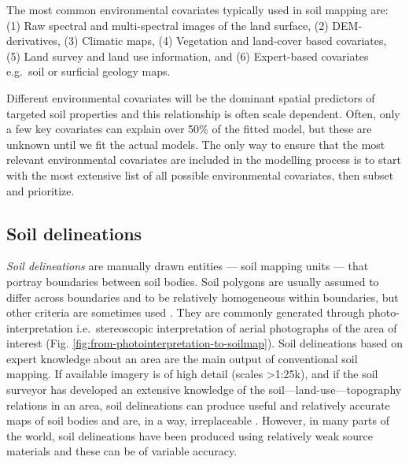 \documentclass[graybox,natbib,nospthms,UStrade]{svmono}
\let\BeginKnitrBlock\begin \let\EndKnitrBlock\end
\let\BeginKnitrBlock\begin \let\EndKnitrBlock\end
\begin{document}
\BeginKnitrBlock{rmdnote}
The most common environmental covariates typically used in soil mapping
are: (1) Raw spectral and multi-spectral images of the land surface, (2)
DEM-derivatives, (3) Climatic maps, (4) Vegetation and land-cover based
covariates, (5) Land survey and land use information, and (6)
Expert-based covariates e.g.~soil or surficial geology maps.
\EndKnitrBlock{rmdnote}

Different environmental covariates will be the dominant spatial predictors of
targeted soil properties and this relationship is often scale dependent. Often, only a few key covariates can
explain over 50\% of the fitted model, but these are unknown until we fit the
actual models. The only way to ensure that the most relevant environmental
covariates are included in the modelling process is to start with the
most extensive list of all possible environmental covariates, then subset and
prioritize.

\hypertarget{soil-delineations}{%
\subsection{Soil delineations}\label{soil-delineations}}

\emph{Soil delineations} are manually drawn entities --- soil mapping units ---
that portray boundaries between soil bodies. Soil polygons are usually
assumed to differ across boundaries and to be relatively homogeneous
within boundaries, but other criteria are sometimes used
\citep{Simonson1968AA, Schelling1970Geoderma}. They are commonly generated
through photo-interpretation i.e.~stereoscopic interpretation of aerial
photographs of the area of interest
(Fig. \ref{fig:from-photointerpretation-to-soilmap}). Soil
delineations based on expert knowledge about an area are the main output
of conventional soil mapping. If available imagery is of high detail
(scales \textgreater{}1:25k), and if the soil surveyor has developed an extensive
knowledge of the soil---land-use---topography relations in an area, soil
delineations can produce useful and relatively accurate maps of soil
bodies and are, in a way, irreplaceable \citep{SSS1983USDA}. However, in many
parts of the world, soil delineations have been produced using
relatively weak source materials and these can be of variable accuracy.
\end{document}
